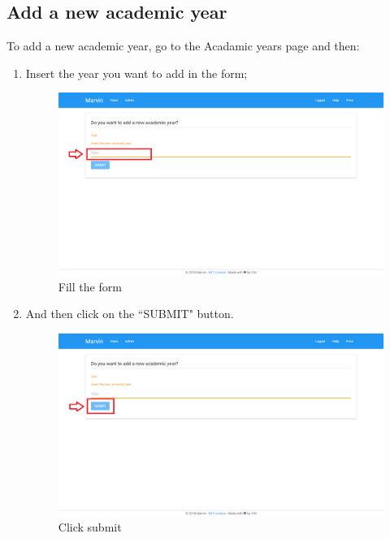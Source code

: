 \documentclass[ManualeUtente]{subfiles}
\begin{document}
	\subsection{Add a new academic year}
	To add a new academic year, go to the Acadamic years page and then:
	\begin{enumerate}
		\item Insert the year you want to add in the form;
		\begin{figure}[H]
			\centering
			\includegraphics[width=0.7\linewidth]{image/UniversityAddYear1}
			\caption[Add year form]{Fill the form}
			\label{fig:Add a new academic year, fill the form}
		\end{figure} \newpage
		\item And then click on the ``SUBMIT" button.
		\begin{figure}[H]
			\centering
			\includegraphics[width=0.7\linewidth]{image/UniversityAddYear2}
			\caption[Add year submit]{Click submit}
			\label{fig:Add a new academic year, click submit}
		\end{figure}
	\end{enumerate}
\end{document}
